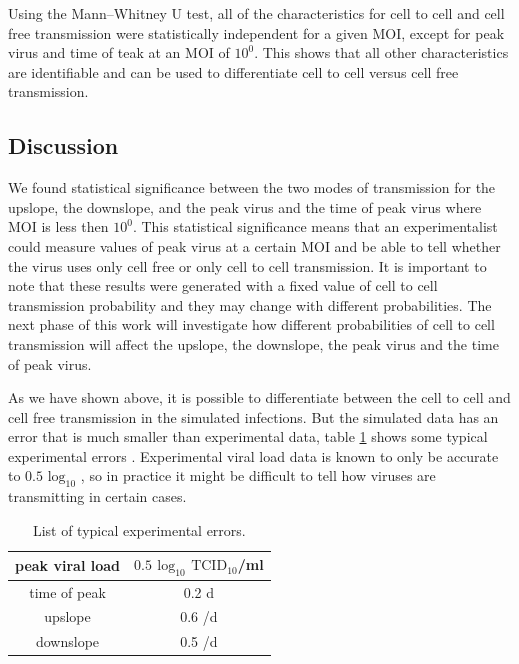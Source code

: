 \documentclass[a4paper]{article}
\begin{document}
Using the Mann–Whitney U test, all of the characteristics for cell to cell and cell free transmission were statistically independent for a given MOI, except for peak virus and time of teak at an MOI of $10^0$. This shows that all other characteristics are identifiable and can be used to differentiate cell to cell versus cell free transmission.


%

\subsection{Discussion}
We found statistical significance between the two modes of transmission for the upslope, the downslope, and the peak virus and the time of peak virus where MOI is less then $10^0$. This statistical significance means that an experimentalist could measure values of peak virus at a certain MOI and be able to tell whether the virus uses only cell free or only cell to cell transmission. It is important to note that these results were generated with a fixed value of cell to cell transmission probability and they may change with different probabilities. The next phase of this work will investigate how different probabilities of cell to cell transmission  will affect the upslope, the downslope, the peak virus and the time of peak virus.

As we have shown above, it is possible to differentiate between the cell to cell and cell free transmission in the simulated infections. But the simulated data has an error that is much smaller than experimental data, table \ref{tab:AdvectionSpeeds} shows some typical experimental errors \cite{Parra, LaBarre}. Experimental viral load data is known to only be accurate to $0.5$ $\mathrm{log}_{10}$ \cite{LaBarre}, so in practice it might be difficult to tell how viruses are transmitting in certain cases.

\begin{table}[h]
    \centering
    \caption{List of typical experimental errors.}
    \begin{tabular}{|c|c|}
        \hline
        peak viral load  & $0.5$ $\mathrm{log}_{10}$ $\mathrm{TCID}_{10}$/ml\\
        \hline
        time of peak  & 0.2 d\\
        \hline
        upslope  & 0.6 /d\\
        \hline
        downslope  & 0.5 /d\\
        \hline
    \end{tabular}
    \label{tab:AdvectionSpeeds}
\end{table}
\end{document}
